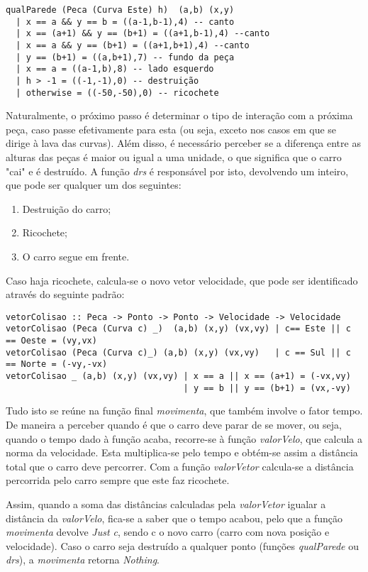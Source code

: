 \documentclass[a4paper]{report}
\begin{document}
\begin{verbatim}
qualParede (Peca (Curva Este) h)  (a,b) (x,y)
  | x == a && y == b = ((a-1,b-1),4) -- canto
  | x == (a+1) && y == (b+1) = ((a+1,b-1),4) --canto
  | x == a && y == (b+1) = ((a+1,b+1),4) --canto
  | y == (b+1) = ((a,b+1),7) -- fundo da peça
  | x == a = ((a-1,b),8) -- lado esquerdo
  | h > -1 = ((-1,-1),0) -- destruição
  | otherwise = ((-50,-50),0) -- ricochete
\end{verbatim}

Naturalmente, o próximo passo é determinar o tipo de interação com a próxima peça, caso passe efetivamente para esta (ou seja, exceto nos casos em que se dirige à lava das curvas). Além disso, é necessário perceber se a diferença entre as alturas das peças é maior ou igual a uma unidade, o que significa que o carro "cai" e é destruído. A função \textit{drs} é responsável por isto, devolvendo um inteiro, que pode ser qualquer um dos seguintes:

\begin{enumerate}
    \item Destruição do carro;
    \item Ricochete;
    \item O carro segue em frente.
\end{enumerate}

Caso haja ricochete, calcula-se o novo vetor velocidade, que pode ser identificado através do seguinte padrão:

\begin{lstlisting}
vetorColisao :: Peca -> Ponto -> Ponto -> Velocidade -> Velocidade
vetorColisao (Peca (Curva c) _)  (a,b) (x,y) (vx,vy) | c== Este || c == Oeste = (vy,vx)
vetorColisao (Peca (Curva c)_) (a,b) (x,y) (vx,vy)   | c == Sul || c == Norte = (-vy,-vx)
vetorColisao _ (a,b) (x,y) (vx,vy) | x == a || x == (a+1) = (-vx,vy)
                                   | y == b || y == (b+1) = (vx,-vy)
\end{lstlisting}

Tudo isto se reúne na função final \textit{movimenta}, que também involve o fator tempo. De maneira a perceber quando é que o carro deve parar de se mover, ou seja, quando o tempo dado à função acaba, recorre-se à função \textit{valorVelo}, que calcula a norma da velocidade. Esta multiplica-se pelo tempo e obtém-se assim a distância total que o carro deve percorrer. Com a função \textit{valorVetor} calcula-se a distância percorrida pelo carro sempre que este faz ricochete.

Assim, quando a soma das distâncias calculadas pela \textit{valorVetor} igualar a distância da \textit{valorVelo}, fica-se a saber que o tempo acabou, pelo que a função \textit{movimenta} devolve \textit{Just c}, sendo c o novo carro (carro com nova posição e velocidade). Caso o carro seja destruído a qualquer ponto (funções \textit{qualParede} ou \textit{drs}), a \textit{movimenta} retorna \textit{Nothing}.
\end{document}
